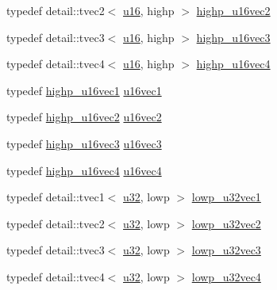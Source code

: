 \begin{CompactItemize}
\item 
typedef detail::tvec2$<$ \hyperlink{group__gtc__type__precision_ge7a1571503f83d2264ddfa705a6b082a}{u16}, highp $>$ \hyperlink{group__gtc__type__precision_gfad4245d389a4990eb505cd74a2d0a6f}{highp\_\-u16vec2}
\item 
typedef detail::tvec3$<$ \hyperlink{group__gtc__type__precision_ge7a1571503f83d2264ddfa705a6b082a}{u16}, highp $>$ \hyperlink{group__gtc__type__precision_gd98b30ad9bbfb79233340be3ba53ceb6}{highp\_\-u16vec3}
\item 
typedef detail::tvec4$<$ \hyperlink{group__gtc__type__precision_ge7a1571503f83d2264ddfa705a6b082a}{u16}, highp $>$ \hyperlink{group__gtc__type__precision_g89074b108ec0643cffdfd008bedd3ffb}{highp\_\-u16vec4}
\item 
typedef \hyperlink{group__gtc__type__precision_gc4a83dec879b77ab0055c8da232da066}{highp\_\-u16vec1} \hyperlink{group__gtc__type__precision_g95324b9d781c51a6d31b05fcc63c5cbe}{u16vec1}
\item 
typedef \hyperlink{group__gtc__type__precision_gfad4245d389a4990eb505cd74a2d0a6f}{highp\_\-u16vec2} \hyperlink{group__gtc__type__precision_g4beac509930099bb494b4bd0a44c49f2}{u16vec2}
\item 
typedef \hyperlink{group__gtc__type__precision_gd98b30ad9bbfb79233340be3ba53ceb6}{highp\_\-u16vec3} \hyperlink{group__gtc__type__precision_g372e1184da616b77fcbd48b8c166c24a}{u16vec3}
\item 
typedef \hyperlink{group__gtc__type__precision_g89074b108ec0643cffdfd008bedd3ffb}{highp\_\-u16vec4} \hyperlink{group__gtc__type__precision_gac02cce8820bcdbbeea9659aeaa718fb}{u16vec4}
\item 
typedef detail::tvec1$<$ \hyperlink{group__gtc__type__precision_g54e837745059fd29017bed71cfa0a8db}{u32}, lowp $>$ \hyperlink{group__gtc__type__precision_g579d71c2ae1225b689aaab0bc7d33146}{lowp\_\-u32vec1}
\item 
typedef detail::tvec2$<$ \hyperlink{group__gtc__type__precision_g54e837745059fd29017bed71cfa0a8db}{u32}, lowp $>$ \hyperlink{group__gtc__type__precision_g2f588e15c609987b89bd03f50b2a492d}{lowp\_\-u32vec2}
\item 
typedef detail::tvec3$<$ \hyperlink{group__gtc__type__precision_g54e837745059fd29017bed71cfa0a8db}{u32}, lowp $>$ \hyperlink{group__gtc__type__precision_g53b6133cd2491fce1445c1744556b1bb}{lowp\_\-u32vec3}
\item 
typedef detail::tvec4$<$ \hyperlink{group__gtc__type__precision_g54e837745059fd29017bed71cfa0a8db}{u32}, lowp $>$ \hyperlink{group__gtc__type__precision_gad6408408c9c5321cb6ee54f201de578}{lowp\_\-u32vec4}

\end{CompactItemize}
